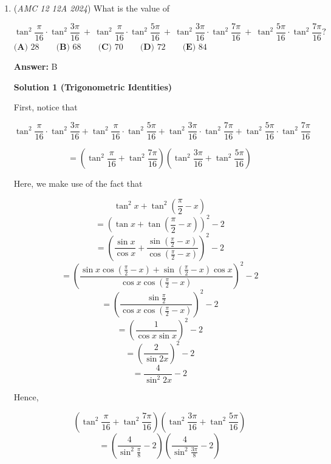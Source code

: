 \begin{enumerate}
\textbf{Solution 3 (Observation)}

We have $2$ cases where the loop does not go through the middle. 

 If the loop goes through the middle, we must have a full column on $(0,8),(0,7),(1,8),(1,7).$ Then we have $6,5,5,4$ empty middle squares. For each one we can have one on top or one on bottom, so $2^6+2^5+2^5+2^4=144.$ Notice that for each case of fixed toothpicks, there is only one way to form the loop. Then we just add $2+144=\boxed{\textbf{(C) } 146.}$



	\item (\textit{AMC 12 12A 2024}) What is the value of 


 
 \[\tan^2 \frac {\pi}{16} \cdot \tan^2 \frac {3\pi}{16}~ + ~ \tan^2 \frac {\pi}{16} \cdot \tan^2 \frac {5\pi}{16} ~+~\tan^2 \frac {3\pi}{16} \cdot \tan^2 \frac {7\pi}{16} ~+~ \tan^2 \frac {5\pi}{16} \cdot \tan^2 \frac {7\pi}{16}?\]
$\textbf{(A) } 28 \qquad \textbf{(B) } 68 \qquad \textbf{(C) } 70 \qquad \textbf{(D) } 72 \qquad \textbf{(E) } 84$

 \textbf{Answer: }B



\textbf{Solution 1 (Trigonometric Identities)}

First, notice that

 
 \[\tan^2 \frac {\pi}{16} \cdot \tan^2 \frac {3\pi}{16} + \tan^2 \frac {\pi}{16} \cdot \tan^2 \frac {5\pi}{16}+\tan^2 \frac {3\pi}{16} \cdot \tan^2 \frac {7\pi}{16}+\tan^2 \frac {5\pi}{16} \cdot \tan^2 \frac {7\pi}{16}\]

 \[=(\tan^2\frac{\pi}{16}+\tan^2 \frac{7\pi}{16})(\tan^2\frac{3\pi}{16}+\tan^2 \frac{5\pi}{16})\]

 
Here, we make use of the fact that

 
 \[\tan^2 x+\tan^2 (\frac{\pi}{2}-x)\]
 \[=(\tan x+\tan (\frac{\pi}{2}-x))^2-2\]
 \[=\left(\frac{\sin x}{\cos x}+\frac{\sin (\frac{\pi}{2}-x)}{\cos (\frac{\pi}{2}-x)}\right)^2-2\]
 \[=\left(\frac{\sin x \cos (\frac{\pi}{2}-x)+\sin (\frac{\pi}{2}-x) \cos x}{\cos x \cos (\frac{\pi}{2}-x)}\right)^2-2\]
 \[=\left(\frac{\sin \frac{\pi}{2}}{\cos x \cos (\frac{\pi}{2}-x)}\right)^2-2\]
 \[=\left(\frac{1}{\cos x \sin x}\right)^2-2\]
 \[=\left(\frac{2}{\sin 2x}\right)^2-2\]
 \[=\frac{4}{\sin^2 2x}-2\]

 Hence,

 
 \[(\tan^2\frac{\pi}{16}+\tan^2 \frac{7\pi}{16})(\tan^2\frac{3\pi}{16}+\tan^2 \frac{5\pi}{16})\]
 \[=\left(\frac{4}{\sin^2 \frac{\pi}{8}}-2\right)\left(\frac{4}{\sin^2 \frac{3\pi}{8}}-2\right)\]


\end{enumerate}
